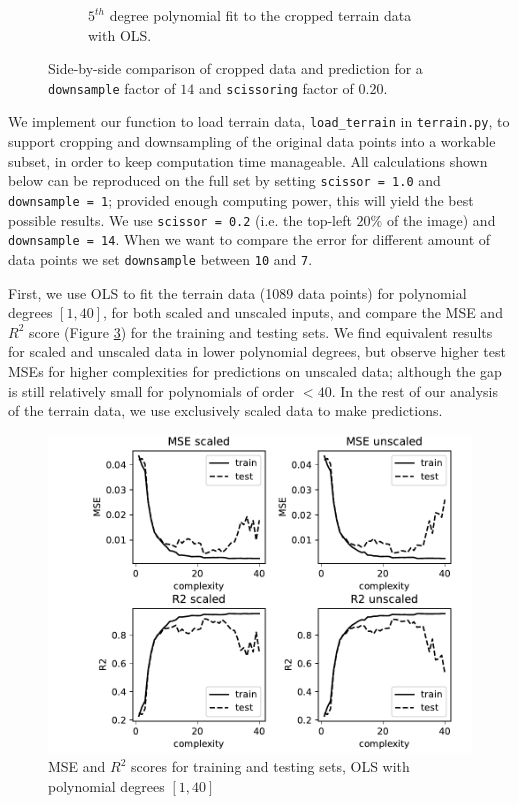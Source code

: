 \documentclass[10pt, a4paper]{article}
\begin{document}
\begin{figure}[h]
\begin{subfigure}{.49\textwidth}
            \caption{$5^{th}$ degree polynomial fit to the cropped terrain data with OLS.}
            \label{fig:ex6}
        \end{subfigure}
        \caption{Side-by-side comparison of cropped data and prediction for a \texttt{downsample} factor of $14$ and \texttt{scissoring} factor of $0.20$.}
        \label{fig:ex6}
    \end{figure}
    
    We implement our function to load terrain data, \texttt{load\_terrain} in \texttt{terrain.py}, to support cropping and downsampling of the original data points into a workable subset, in order to keep computation time manageable. All calculations shown below can be reproduced on the full set by setting \texttt{scissor = 1.0} and \texttt{downsample = 1}; provided enough computing power, this will yield the best possible results. We use \texttt{scissor = 0.2} (i.e. the top-left $20\%$ of the image) and \texttt{downsample = 14}. When we want to compare the error for different amount of data points we set \texttt{downsample} between \texttt{10} and \texttt{7}.
    
    First, we use OLS to fit the terrain data (1089 data points) for polynomial degrees $[1, 40]$, for both scaled and unscaled inputs, and compare the MSE and $R^2$ score (Figure \ref{fig:ex6-mse}) for the training and testing sets. We find equivalent results for scaled and unscaled data in lower polynomial degrees, but observe higher test MSEs for higher complexities for predictions on unscaled data; although the gap is still relatively small for polynomials of order $< 40$. In the rest of our analysis of the terrain data, we use exclusively scaled data to make predictions.
    
    \begin{figure}[h] %
        \centering
        \includegraphics[scale=0.7]{ex6_mse_r2_comp.pdf}
        \caption{MSE and $R^2$ scores for training and testing sets, OLS with polynomial degrees $[1, 40]$}
        \label{fig:ex6-mse}
    \end{figure}
    
\end{document}
